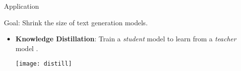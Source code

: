 \begin{frame}{Application}

  Goal: Shrink the size of text generation models.


\begin{itemize}
\item \textbf{Knowledge Distillation}: Train a \textit{student} model to learn
from a \textit{teacher} model \cite{Bucila2006,Ba2014,Hinton2015}.

\begin{center}
  \texttt{[image: distill]}
\end{center}
\end{itemize}






\end{frame}







